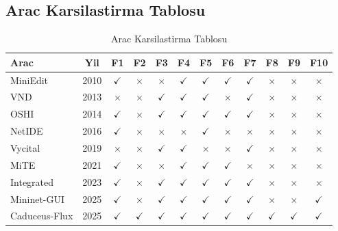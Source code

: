 \documentclass[conference]{IEEEtran}
\begin{document}
\subsection{Arac Karsilastirma Tablosu}
\begin{table}[t]
\caption{Arac Karsilastirma Tablosu}
\label{tab:tools}
\centering
\scriptsize
\setlength{\tabcolsep}{3pt}
\begin{tabular}{l c c c c c c c c c c c}
\toprule
\textbf{Arac} & \textbf{Yil} & \textbf{F1} & \textbf{F2} & \textbf{F3} & \textbf{F4} & \textbf{F5} & \textbf{F6} & \textbf{F7} & \textbf{F8} & \textbf{F9} & \textbf{F10} \\
\midrule
MiniEdit & 2010 & $\checkmark$ & $\times$ & $\times$ & $\checkmark$ & $\checkmark$ & $\checkmark$ & $\checkmark$ & $\times$ & $\times$ & $\times$ \\
VND & 2013 & $\times$ & $\times$ & $\checkmark$ & $\checkmark$ & $\checkmark$ & $\times$ & $\checkmark$ & $\times$ & $\times$ & $\times$ \\
OSHI & 2014 & $\checkmark$ & $\times$ & $\checkmark$ & $\checkmark$ & $\checkmark$ & $\checkmark$ & $\checkmark$ & $\times$ & $\times$ & $\times$ \\
NetIDE & 2016 & $\checkmark$ & $\times$ & $\times$ & $\times$ & $\checkmark$ & $\times$ & $\times$ & $\times$ & $\times$ & $\times$ \\
Vycital & 2019 & $\times$ & $\times$ & $\checkmark$ & $\checkmark$ & $\times$ & $\times$ & $\checkmark$ & $\times$ & $\times$ & $\times$ \\
MiTE & 2021 & $\checkmark$ & $\times$ & $\times$ & $\checkmark$ & $\checkmark$ & $\checkmark$ & $\times$ & $\times$ & $\times$ & $\times$ \\
Integrated & 2023 & $\checkmark$ & $\times$ & $\checkmark$ & $\checkmark$ & $\checkmark$ & $\checkmark$ & $\checkmark$ & $\times$ & $\times$ & $\times$ \\
Mininet-GUI & 2025 & $\checkmark$ & $\times$ & $\checkmark$ & $\checkmark$ & $\checkmark$ & $\checkmark$ & $\checkmark$ & $\times$ & $\times$ & $\checkmark$ \\
Caduceus-Flux & 2025 & $\checkmark$ & $\checkmark$ & $\checkmark$ & $\checkmark$ & $\checkmark$ & $\checkmark$ & $\checkmark$ & $\checkmark$ & $\checkmark$ & $\checkmark$ \\
\bottomrule
\end{tabular}
\end{table}
\end{document}
